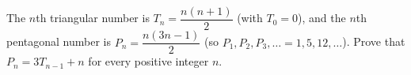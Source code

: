 The $n$th triangular number is $T_n=\dfrac{n(n+1)}{2}$ (with $T_0=0$), and the $n$th pentagonal number is $P_n=\dfrac{n(3n-1)}{2}$ (so $P_1,P_2,P_3,\dots=1,5,12,\dots$). Prove that $P_n=3T_{n-1}+n$ for every positive integer $n$.
